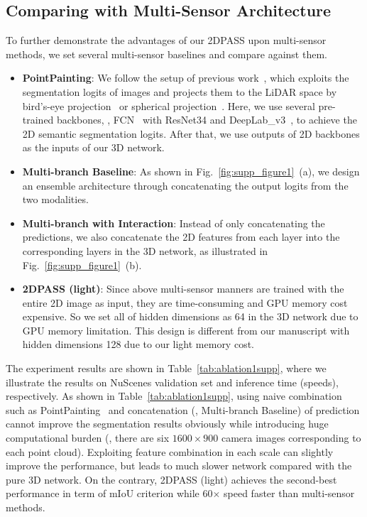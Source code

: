 \documentclass[runningheads]{llncs}
\begin{document}
	\subsection{Comparing with Multi-Sensor Architecture}
	To further demonstrate the advantages of our 2DPASS upon multi-sensor methods, we set several multi-sensor baselines and compare against them.
	\begin{itemize}
		\item \textbf{PointPainting}: We follow the setup of previous work~\cite{vora2020pointpainting}, which exploits the segmentation logits of images and projects them to the LiDAR space by bird's-eye projection~\cite{yuan2018ocnet} or spherical projection~\cite{milioto2019rangenet++}. 
Here, we use several pre-trained backbones, \ie,  FCN~\cite{long2015fully} with ResNet34\cite{he2016deep} and DeepLab\_v3~\cite{chen2017rethinking}, to achieve the 2D semantic segmentation logits.
After that, we use outputs of 2D backbones as the inputs of our 3D network.
		
		
		\item \textbf{Multi-branch Baseline}: As shown in Fig.~\ref{fig:supp_figure1}~(a), we design an ensemble architecture through concatenating the output logits from the two modalities.


		
		\item \textbf{Multi-branch with Interaction}: Instead of only concatenating the predictions, we also concatenate the 2D features from each layer into the corresponding layers in the 3D network, as illustrated in Fig.~\ref{fig:supp_figure1}~(b).
		
		\item \textbf{2DPASS (light)}:  Since above multi-sensor manners are trained with the entire 2D image as input, they are time-consuming and GPU memory cost expensive. So we set all of hidden dimensions as 64 in the 3D network due to GPU memory limitation. This design is different from our manuscript with hidden dimensions 128 due to our light memory cost.
		
	\end{itemize}
	
	The experiment results are shown in Table~\ref{tab:ablation1supp}, where we illustrate the results on NuScenes validation set and inference time (speeds), respectively.
As shown in Table~\ref{tab:ablation1supp}, using naive combination such as PointPainting~\cite{vora2020pointpainting} and concatenation (\ie, Multi-branch Baseline) of prediction cannot improve the segmentation results obviously while introducing huge computational burden (\ie, there are six $1600\times 900$ camera images corresponding to each point cloud).
Exploiting feature combination in each scale can slightly improve the performance, but leads to much slower network compared with the pure 3D network.
On the contrary, 2DPASS (light) achieves the second-best performance in term of mIoU criterion while 60$\times$ speed faster than multi-sensor methods.
	
\end{document}
